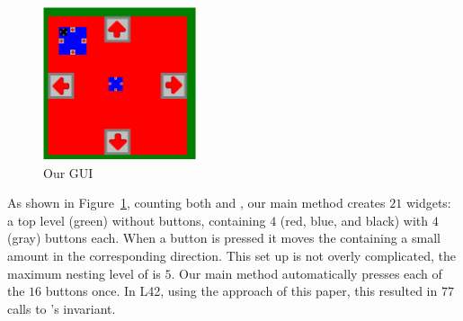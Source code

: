 \begin{figure}
	\centering \includegraphics[width=0.4\textwidth]{GuiImg}
	\caption{Our GUI}\label{f:gui}
\end{figure}
As shown in Figure~\ref{f:gui}, counting both \Q@SafeMovable@s and \Q@Button@s, our main method creates $21$ widgets: a top level (green) \Q@SafeMovable@ without buttons, containing $4$ (red, blue, and black) \Q@SafeMovable@s with
$4$ (gray) buttons each. When a button is pressed it moves the containing \Q@SafeMovable@ a small amount in the corresponding direction.
This set up is not overly complicated, the maximum nesting level of \Q@Widget@s is $5$.
Our main method automatically presses each of the $16$ buttons once. In L42, using the approach of this paper, this resulted in $77$ calls to \Q@SafeMovable@'s invariant.

